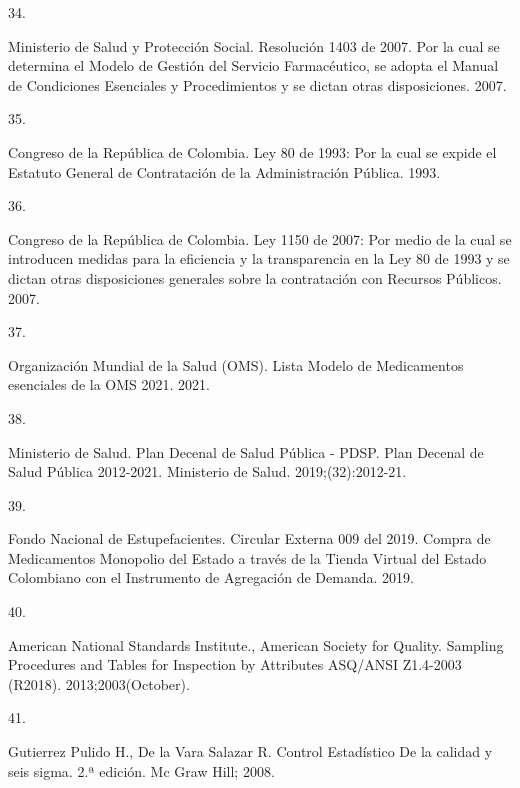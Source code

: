 \documentclass[
]{book}
\newlength{\cslhangindent}
\newlength{\csllabelwidth}
\newlength{\cslentryspacingunit} %
\newenvironment{CSLReferences}[2] %
 {%
  \setlength{\parindent}{0pt}
  \ifodd #1
  \let\oldpar\par
  \def\par{\hangindent=\cslhangindent\oldpar}
  \fi
  \setlength{\parskip}{#2\cslentryspacingunit}
 }%
 {}
\newcommand{\CSLLeftMargin}[1]{\parbox[t]{\csllabelwidth}{#1}}
\newcommand{\CSLRightInline}[1]{\parbox[t]{\linewidth - \csllabelwidth}{#1}\break}
\begin{document}
\begin{CSLReferences}{0}{0}
\leavevmode{}%
\CSLLeftMargin{34. }
\CSLRightInline{Ministerio de Salud y Protección Social. {Resoluci{ó}n 1403 de 2007. Por la cual se determina el Modelo de Gesti{ó}n del Servicio Farmac{é}utico, se adopta el Manual de Condiciones Esenciales y Procedimientos y se dictan otras disposiciones}. 2007.}

\leavevmode{}%
\CSLLeftMargin{35. }
\CSLRightInline{Congreso de la República de Colombia. {Ley 80 de 1993: Por la cual se expide el Estatuto General de Contrataci{ó}n de la Administraci{ó}n P{ú}blica}. 1993.}

\leavevmode{}%
\CSLLeftMargin{36. }
\CSLRightInline{Congreso de la República de Colombia. {Ley 1150 de 2007: Por medio de la cual se introducen medidas para la eficiencia y la transparencia en la Ley 80 de 1993 y se dictan otras disposiciones generales sobre la contrataci{ó}n con Recursos P{ú}blicos.} 2007.}

\leavevmode{}%
\CSLLeftMargin{37. }
\CSLRightInline{Organización Mundial de la Salud (OMS). {Lista Modelo de Medicamentos esenciales de la OMS 2021}. 2021.}

\leavevmode{}%
\CSLLeftMargin{38. }
\CSLRightInline{Ministerio de Salud. {Plan Decenal de Salud P{ú}blica - PDSP. Plan Decenal de Salud P{ú}blica 2012-2021}. Ministerio de Salud. 2019;(32):2012-21.}

\leavevmode{}%
\CSLLeftMargin{39. }
\CSLRightInline{Fondo Nacional de Estupefacientes. {Circular Externa 009 del 2019. Compra de Medicamentos Monopolio del Estado a trav{é}s de la Tienda Virtual del Estado Colombiano con el Instrumento de Agregaci{ó}n de Demanda}. 2019.}

\leavevmode{}%
\CSLLeftMargin{40. }
\CSLRightInline{American National Standards Institute., American Society for Quality. {Sampling Procedures and Tables for Inspection by Attributes ASQ/ANSI Z1.4-2003 (R2018)}. 2013;2003(October).}

\leavevmode{}%
\CSLLeftMargin{41. }
\CSLRightInline{Gutierrez Pulido H., De la Vara Salazar R. {Control Estad{í}stico De la calidad y seis sigma}. 2.ª edición. Mc Graw Hill; 2008.}


\end{CSLReferences}
\end{document}
